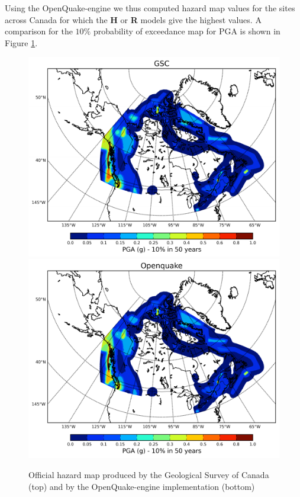 Using the OpenQuake-engine we thus computed hazard map values for the sites
across Canada for which the \textbf{H} or \textbf{R} models give the highest
values. A comparison for the $10\%$ probability of exceedance map for PGA is
shown in Figure \ref{fig:canada_475y_hmaps}.
\begin{figure}
\centering
\includegraphics[width=14cm]{./qareport/pictures/GSC_combined_PGA_0pt1_firm_ground.pdf}
\includegraphics[width=14cm]{./qareport/pictures/OQ_combined_PGA_0pt1_firm_ground.pdf}
\caption{Official hazard map produced by the Geological Survey of Canada (top) and by the OpenQuake-engine implementation (bottom)}
\label{fig:canada_475y_hmaps}
\end{figure}
